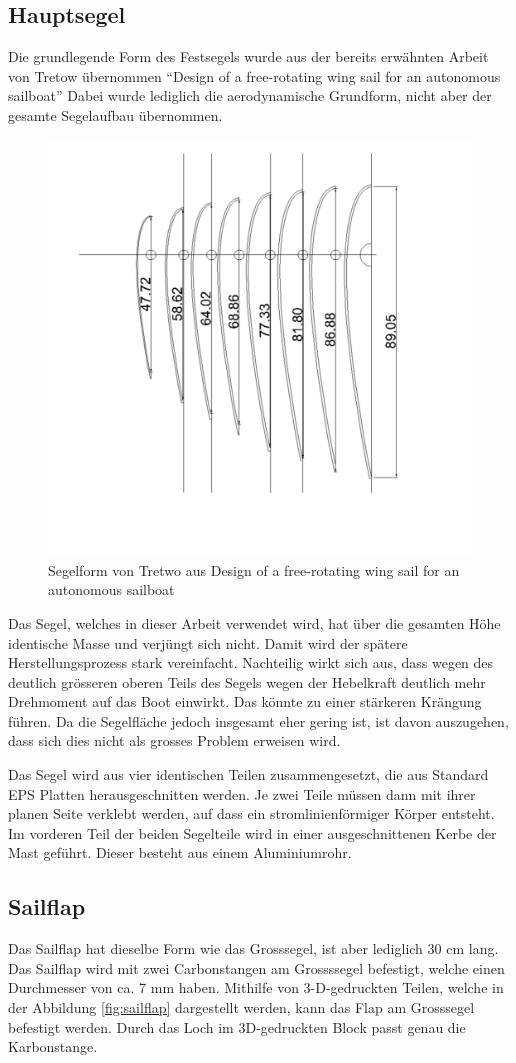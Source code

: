 \subsection{Hauptsegel}
Die grundlegende Form des Festsegels wurde aus der bereits erwähnten Arbeit  von Tretow übernommen \enquote{Design of a free-rotating wing sail for an autonomous sailboat} \cite{Tretow2017DesignOA}
Dabei wurde lediglich die aerodynamische Grundform, nicht aber der gesamte Segelaufbau übernommen.
\begin{figure}[H]
    \centering
    \includegraphics[angle=270,width=0.5\linewidth]{assets/sail_form_foam.png}
    \caption{Segelform von Tretwo aus Design of a free-rotating wing sail for an autonomous sailboat}
    \label{fig:enter-label}
\end{figure}
Das Segel, welches in dieser Arbeit verwendet wird, hat über die gesamten Höhe identische Masse und verjüngt sich nicht. Damit wird der spätere Herstellungsprozess stark vereinfacht. Nachteilig wirkt sich aus, dass wegen des deutlich grösseren oberen Teils des Segels wegen der Hebelkraft deutlich mehr Drehmoment auf das Boot einwirkt. Das könnte zu einer stärkeren Krängung führen. Da die Segelfläche jedoch insgesamt eher gering ist, ist davon auszugehen, dass sich dies nicht als grosses Problem erweisen wird.

Das Segel wird aus vier identischen Teilen zusammengesetzt, die aus Standard EPS Platten herausgeschnitten werden. Je zwei Teile müssen dann mit ihrer planen Seite verklebt werden, auf dass ein stromlinienförmiger Körper entsteht. Im vorderen Teil der beiden Segelteile wird in einer ausgeschnittenen Kerbe der Mast geführt. Dieser besteht aus einem Aluminiumrohr.
\subsection{Sailflap}
Das Sailflap hat dieselbe Form wie das Grosssegel, ist aber lediglich 30 cm lang. Das Sailflap wird mit zwei Carbonstangen am Grossssegel befestigt, welche einen Durchmesser von ca. 7 mm haben. Mithilfe von 3-D-gedruckten Teilen, welche in der Abbildung \ref{fig:sailflap} dargestellt werden, kann das Flap am Grosssegel befestigt werden. Durch das Loch im 3D-gedruckten Block passt genau die Karbonstange.


